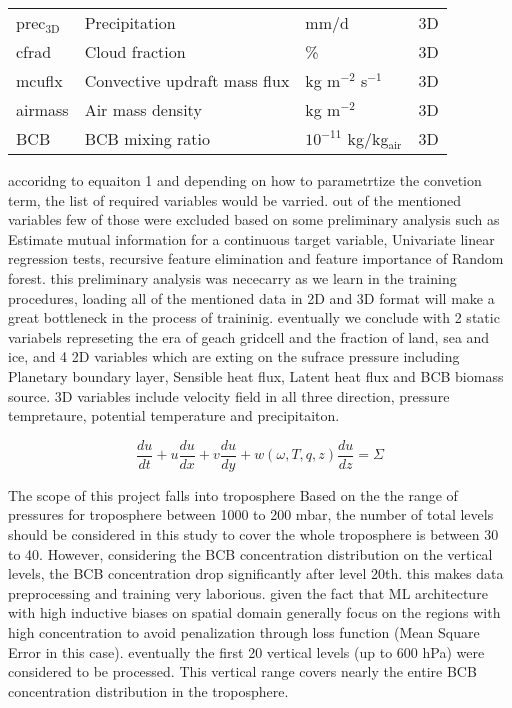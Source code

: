 \documentclass{article}
\begin{document}
\begin{table}[htbp]
\begin{tabular}{llll}
            prec$_{\text{3D}}$  & Precipitation                     & mm/d                               & 3D  \\
            cfrad               & Cloud fraction                    & \%                                 & 3D  \\
            mcuflx              & Convective updraft mass flux      & kg m$^{-2}$ s$^{-1}$               & 3D  \\
            airmass             & Air mass density                  & kg m$^{-2}$                        & 3D  \\
            BCB                 & BCB mixing ratio                  & $10^{-11}$ kg/kg$_{\text{air}}$    & 3D  \\ \hline
        \end{tabular}
    \end{table}
    
    accoridng to equaiton 1 and depending on how to parametrtize the convetion term, the list of required variables would be varried. out of the mentioned variables few of those were excluded based on some preliminary analysis such as Estimate mutual information for a continuous target variable, Univariate linear regression tests, recursive feature elimination and feature importance of Random forest. this preliminary analysis was nececarry as we learn in the training procedures, loading all of the mentioned data in 2D and 3D format will make a great bottleneck in the process of traininig. eventually we conclude with 2 static variabels represeting the era of geach gridcell and the fraction of land, sea and ice, and 4 2D variables which are exting on the sufrace pressure including  Planetary boundary layer, Sensible heat flux, Latent heat flux and BCB biomass source. 3D variables include velocity field in all three direction, pressure tempretaure, potential temperature and precipitaiton.
    
    \begin{equation}
        \frac{du}{dt} + u\frac{du}{dx} + v\frac{du}{dy} + w(\omega,T,q,z)\frac{du}{dz} = \Sigma
    \end{equation}

    The scope of this project falls into troposphere Based on the the range of pressures for troposphere between 1000 to 200 mbar, the number of total levels should be considered in this study to cover the whole troposphere is between 30 to 40. However, considering the BCB concentration distribution on the vertical levels, the BCB concentration drop significantly after level 20th. this makes data preprocessing and training very laborious. given the fact that ML architecture with high inductive biases on spatial domain generally focus on the regions with high concentration to avoid penalization through loss function (Mean Square Error in this case). eventually the first 20 vertical levels (up to 600 hPa) were considered to be processed. This vertical range covers nearly the entire BCB concentration distribution in the troposphere.
\end{document}
